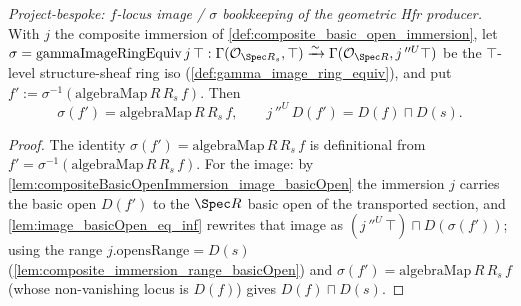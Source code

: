 \begin{lemma}
  \label{lem:composite_immersion_flocus_basicOpen}
  \textit{Project-bespoke: $f$-locus image / $\sigma$ bookkeeping of the geometric Hfr producer.}
  With \(j\) the composite immersion of \cref{def:composite_basic_open_immersion}, let
  \(\sigma = \mathrm{gammaImageRingEquiv}\,j\,\top : \Gamma(\mathcal{O}_{\Spec R_s}, \top) \xrightarrow{\sim}
  \Gamma(\mathcal{O}_{\Spec R}, j\,''^{U}\top)\) be the \(\top\)-level structure-sheaf ring iso
  (\cref{def:gamma_image_ring_equiv}), and put \(f' := \sigma^{-1}(\mathrm{algebraMap}\,R\,R_s\,f)\). Then
  \[
    \sigma(f') = \mathrm{algebraMap}\,R\,R_s\,f, \qquad j\,''^{U}\,D(f') = D(f) \sqcap D(s) .
  \]
\end{lemma}
\begin{proof}
  The identity \(\sigma(f') = \mathrm{algebraMap}\,R\,R_s\,f\) is definitional from
  \(f' = \sigma^{-1}(\mathrm{algebraMap}\,R\,R_s\,f)\). For the image: by
  \cref{lem:compositeBasicOpenImmersion_image_basicOpen} the immersion \(j\) carries the basic open
  \(D(f')\) to the \(\Spec R\) basic open of the transported section, and
  \cref{lem:image_basicOpen_eq_inf} rewrites that image as
  \((j\,''^{U}\,\top) \sqcap D(\sigma(f'))\); using the range
  \(j.\mathrm{opensRange} = D(s)\) (\cref{lem:composite_immersion_range_basicOpen}) and
  \(\sigma(f') = \mathrm{algebraMap}\,R\,R_s\,f\) (whose non-vanishing locus is \(D(f)\)) gives
  \(D(f) \sqcap D(s)\).
\end{proof}

